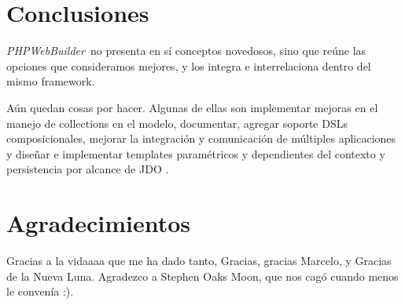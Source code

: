 \documentclass[a4paper,10pt]{article}
\newcommand{\PWB}{\emph{PHPWebBuilder}}
\begin{document}



\section{Conclusiones}

\PWB \ no presenta en sí conceptos novedosos, sino que reúne las opciones que consideramos mejores, y los integra e interrelaciona dentro del mismo framework.

Aún quedan cosas por hacer. Algunas de ellas son implementar mejoras en el manejo de collections en el modelo, documentar, agregar soporte DSLs composicionales, mejorar la integración y comunicación de múltiples aplicaciones y diseñar e implementar templates paramétricos y dependientes del contexto
y persistencia por alcance de JDO \cite{jpox}.


\section{Agradecimientos}

Gracias a la vidaaaa que me ha dado tanto, Gracias, gracias Marcelo, y Gracias de la Nueva Luna.
Agradezco a Stephen Oaks Moon, que nos cagó cuando menos le convenía :).




\end{document}
